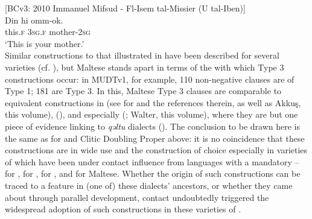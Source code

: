 \documentclass[output=paper]{langsci/langscibook}
\begin{document}
\ea\label{cop1}
{[BCv3: 2010 Immanuel Mifsud - Fl-Isem tal-Missier (U tal-Iben)]}\\
\gll Din hi omm-ok.\\
	this.\textsc{f} \textsc{3sg.f} mother-\textsc{2sg}\\
	\glt `This is your mother.'\\
\z
Similar  constructions to that illustrated in  have been described for several  varieties (cf. \citealt[355]{Vanhove1993}), but Maltese stands apart in terms of the  with which Type 3 constructions occur: in MUDTv1, for example, 110 non-negative  clauses are of Type 1; 181 are Type 3. In this, Maltese Type 3  clauses are comparable to equivalent  constructions in   (see \citealt[172--173]{Lahdo2009} for   and the references therein, as well as Akkuş, this volume),   (\citealt[105]{Andalusi2013}), and especially   (\citealt[135]{Borg1985}; Walter, this volume), where they are but one piece of evidence linking   to \textit{qəltu} dialects (\citealt[31]{Borg2004}). The conclusion to be drawn here is the same as for  and Clitic Doubling Proper above: it is no coincidence that these  constructions are in wide use and the  construction of choice especially in varieties of  which have been under contact influence from languages with a mandatory  --  for  ,  for  ,  for  , and  for Maltese. Whether the origin of such constructions can be traced to a feature in (one of) these dialects'   ancestors, or whether they came about through parallel development, contact undoubtedly triggered the widespread adoption of such constructions in these varieties of .
\end{document}
